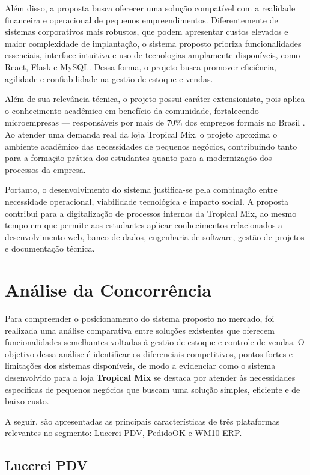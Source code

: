 Além disso, a proposta busca oferecer uma solução compatível com a realidade financeira e operacional de pequenos empreendimentos. Diferentemente de sistemas corporativos mais robustos, que podem apresentar custos elevados e maior complexidade de implantação, o sistema proposto prioriza funcionalidades essenciais, interface intuitiva e uso de tecnologias amplamente disponíveis, como React, Flask e MySQL. Dessa forma, o projeto busca promover eficiência, agilidade e confiabilidade na gestão de estoque e vendas.

Além de sua relevância técnica, o projeto possui caráter extensionista, pois aplica o conhecimento acadêmico em benefício da comunidade, fortalecendo microempresas — responsáveis por mais de 70\% dos empregos formais no Brasil \cite{sebrae2024}. Ao atender uma demanda real da loja Tropical Mix, o projeto aproxima o ambiente acadêmico das necessidades de pequenos negócios, contribuindo tanto para a formação prática dos estudantes quanto para a modernização dos processos da empresa.

Portanto, o desenvolvimento do sistema justifica-se pela combinação entre necessidade operacional, viabilidade tecnológica e impacto social. A proposta contribui para a digitalização de processos internos da Tropical Mix, ao mesmo tempo em que permite aos estudantes aplicar conhecimentos relacionados a desenvolvimento web, banco de dados, engenharia de software, gestão de projetos e documentação técnica.


\section{Análise da Concorrência}
Para compreender o posicionamento do sistema proposto no mercado, foi realizada uma análise comparativa entre soluções existentes que oferecem funcionalidades semelhantes voltadas à gestão de estoque e controle de vendas. O objetivo dessa análise é identificar os diferenciais competitivos, pontos fortes e limitações dos sistemas disponíveis, de modo a evidenciar como o sistema desenvolvido para a loja \textbf{Tropical Mix} se destaca por atender às necessidades específicas de pequenos negócios que buscam uma solução simples, eficiente e de baixo custo. 

A seguir, são apresentadas as principais características de três plataformas relevantes no segmento: Luccrei PDV, PedidoOK e WM10 ERP.
\subsection{Luccrei PDV}

